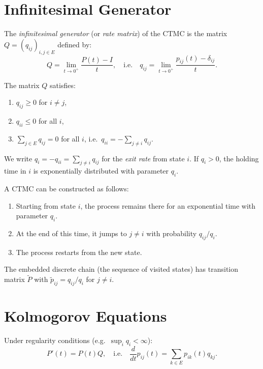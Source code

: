 \section{Infinitesimal Generator}

\begin{definition}
The \emph{infinitesimal generator} (or \emph{rate matrix}) of the CTMC is the
matrix $Q = (q_{ij})_{i,j \in E}$ defined by:
\[
  Q = \lim_{t \to 0^+} \frac{P(t) - I}{t}, \quad \text{i.e.} \quad
  q_{ij} = \lim_{t \to 0^+} \frac{p_{ij}(t) - \delta_{ij}}{t}.
\]
\end{definition}

\begin{proposition}[Properties of $Q$]
The matrix $Q$ satisfies:
\begin{enumerate}
  \item $q_{ij} \geq 0$ for $i \neq j$,
  \item $q_{ii} \leq 0$ for all $i$,
  \item $\sum_{j \in E} q_{ij} = 0$ for all $i$, i.e.\ $q_{ii} = -\sum_{j \neq i} q_{ij}$.
\end{enumerate}
We write $q_i = -q_{ii} = \sum_{j \neq i} q_{ij}$ for the \emph{exit rate} from
state $i$. If $q_i > 0$, the holding time in $i$ is exponentially distributed
with parameter $q_i$.
\end{proposition}

\begin{intuition}[title=\textbf{Construction via Holding Times}]
A CTMC can be constructed as follows:
\begin{enumerate}
  \item Starting from state $i$, the process remains there for an exponential
    time with parameter $q_i$.
  \item At the end of this time, it jumps to $j \neq i$ with probability
    $q_{ij}/q_i$.
  \item The process restarts from the new state.
\end{enumerate}
The embedded discrete chain (the sequence of visited states) has transition
matrix $\tilde{P}$ with $\tilde{p}_{ij} = q_{ij}/q_i$ for $j \neq i$.
\end{intuition}

\section{Kolmogorov Equations}

\begin{theorem}
\label{thm:kolmo_forward}
Under regularity conditions (e.g.\ $\sup_i q_i < \infty$):
\[
  P'(t) = P(t) Q, \quad \text{i.e.} \quad
  \frac{d}{dt} p_{ij}(t) = \sum_{k \in E} p_{ik}(t) q_{kj}.
\]
\end{theorem}

